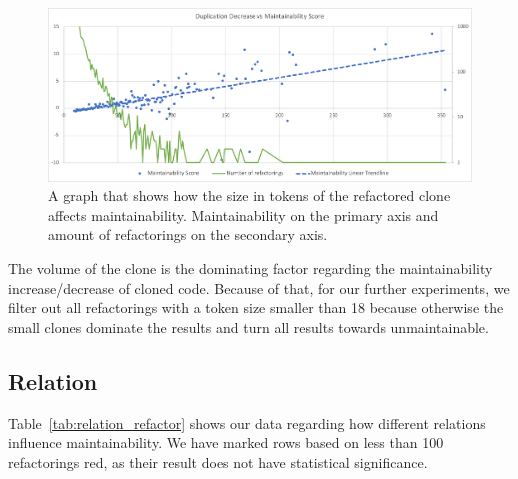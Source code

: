 \begin{figure}[H]
  \includegraphics[width=1\textwidth]{img/duplication}
  \caption{A graph that shows how the size in tokens of the refactored clone affects maintainability. Maintainability on the primary axis and amount of refactorings on the secondary axis.}
  \label{fig:duplication}
\end{figure}

The volume of the clone is the dominating factor regarding the maintainability increase/decrease of cloned code. Because of that, for our further experiments, we filter out all refactorings with a token size smaller than 18 because otherwise the small clones dominate the results and turn all results towards unmaintainable.

\subsection{Relation}
Table~\ref{tab:relation_refactor} shows our data regarding how different relations influence maintainability. We have marked rows based on less than 100 refactorings red, as their result does not have statistical significance.

